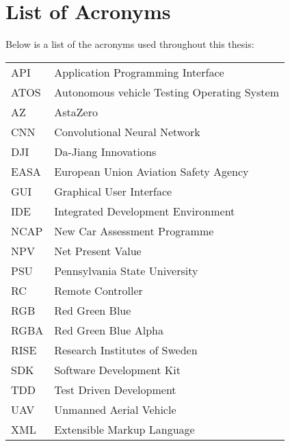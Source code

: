 \thispagestyle{plain}			%
\chapter*{List of Acronyms}
Below is a list of the acronyms used throughout this thesis:
\vspace*{1.0cm}
\newline
\begin{tabular}{p{3cm}p{12cm}}
API & Application Programming Interface \\
ATOS & Autonomous vehicle Testing Operating System\\
AZ & AstaZero \\
CNN & Convolutional Neural Network\\
DJI & Da-Jiang Innovations \\
EASA & European Union Aviation Safety Agency \\
GUI & Graphical User Interface\\
IDE & Integrated Development Environment \\
NCAP & New Car Assessment Programme\\
NPV & Net Present Value \\
PSU & Pennsylvania State University\\
RC & Remote Controller\\
RGB & Red Green Blue \\
RGBA & Red Green Blue Alpha \\
RISE & Research Institutes of Sweden\\
SDK & Software Development Kit \\
TDD & Test Driven Development \\
UAV & Unmanned Aerial Vehicle \\
XML & Extensible Markup Language \\

\end{tabular}



